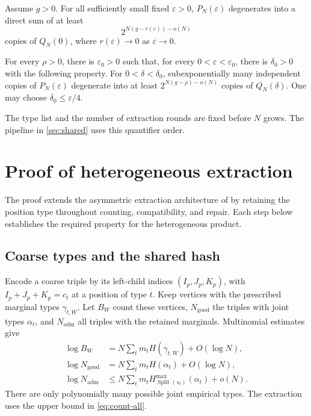 \documentclass[11pt,a4paper]{article}
\DeclareMathOperator{\Split}{Split}
\newcommand{\Ngood}{N_{\mathrm{good}}}
\newcommand{\Nadm}{N_{\mathrm{adm}}}
\begin{document}
\begin{theorem}\label{thm:heterogeneous-precise}
Assume $g>0$. For all sufficiently small fixed $\varepsilon>0$, $P_N(\varepsilon)$ degenerates into a direct sum of at least
\[
2^{N(g-r(\varepsilon))-o(N)}
\]
copies of $Q_N(0)$, where $r(\varepsilon)\to0$ as $\varepsilon\to0$.

For every $\rho>0$, there is $\varepsilon_0>0$ such that, for every $0<\varepsilon<\varepsilon_0$, there is $\delta_0>0$ with the following property. For $0<\delta<\delta_0$, subexponentially many independent copies of $P_N(\varepsilon)$ degenerate into at least $2^{N(g-\rho)-o(N)}$ copies of $Q_N(\delta)$. One may choose $\delta_0\le\varepsilon/4$.
\end{theorem}

The type list and the number of extraction rounds are fixed before $N$ grows. The pipeline in \cref{sec:shared} uses this quantifier order.

\section{Proof of heterogeneous extraction}\label{app:proof}

The proof extends the asymmetric extraction architecture of \citet{alman2025} by retaining the position type throughout counting, compatibility, and repair. Each step below establishes the required property for the heterogeneous product.

\subsection{Coarse types and the shared hash}

Encode a coarse triple by its left-child indices $(I_p,J_p,K_p)$, with $I_p+J_p+K_p=c_t$ at a position of type $t$. Keep vertices with the prescribed marginal types $\gamma_{t,W}$. Let $B_W$ count these vertices, $\Ngood$ the triples with joint types $\alpha_t$, and $\Nadm$ all triples with the retained marginals. Multinomial estimates give
\begin{align}
\log B_W&=N\sum_t m_tH(\gamma_{t,W})+O(\log N),\label{eq:count-vertices}\\
\log\Ngood&=N\sum_t m_tH(\alpha_t)+O(\log N),\label{eq:count-good}\\
\log\Nadm&\le N\sum_t m_tH_{\Split(s_t)}^{\max}(\alpha_t)+o(N).
\label{eq:count-all}
\end{align}
There are only polynomially many possible joint empirical types. The extraction uses the upper bound in \cref{eq:count-all}.
\end{document}
